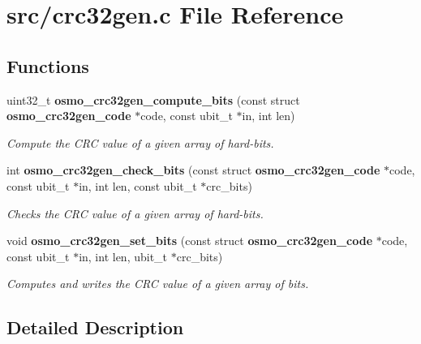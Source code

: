 \section{src/crc32gen.c File Reference}
\label{crc32gen_8c}
\subsection*{Functions}
\begin{DoxyCompactItemize}
\item 
uint32\_\-t {\bf osmo\_\-crc32gen\_\-compute\_\-bits} (const struct {\bf osmo\_\-crc32gen\_\-code} $\ast$code, const ubit\_\-t $\ast$in, int len)
\begin{DoxyCompactList}\small\item\em Compute the CRC value of a given array of hard-\/bits. \item\end{DoxyCompactList}\item 
int {\bf osmo\_\-crc32gen\_\-check\_\-bits} (const struct {\bf osmo\_\-crc32gen\_\-code} $\ast$code, const ubit\_\-t $\ast$in, int len, const ubit\_\-t $\ast$crc\_\-bits)
\begin{DoxyCompactList}\small\item\em Checks the CRC value of a given array of hard-\/bits. \item\end{DoxyCompactList}\item 
void {\bf osmo\_\-crc32gen\_\-set\_\-bits} (const struct {\bf osmo\_\-crc32gen\_\-code} $\ast$code, const ubit\_\-t $\ast$in, int len, ubit\_\-t $\ast$crc\_\-bits)
\begin{DoxyCompactList}\small\item\em Computes and writes the CRC value of a given array of bits. \item\end{DoxyCompactList}\end{DoxyCompactItemize}


\subsection{Detailed Description}
